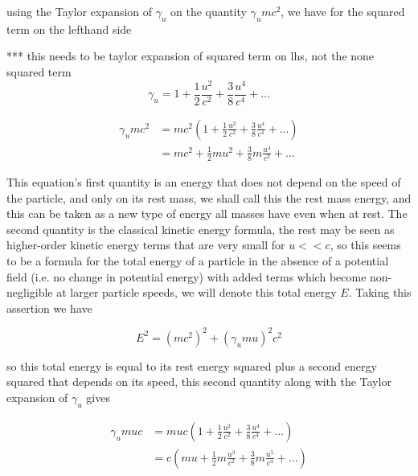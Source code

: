 using the Taylor expansion of $\gamma_{u}$ on the quantity $\gamma_{u} {m}{c}^2$, we have for the squared term on the lefthand side

*** this needs to be taylor expansion of squared term on lhs, not the none squared term
\begin{equation}
	\gamma_{u} = 1 + \frac{1}{2}\frac{u^2}{{c}^2} + \frac{3}{8}\frac{u^4}{c^4} + ...
\end{equation}

\begin{equation}
	\begin{aligned}
		\gamma_{u} {m}{c}^2 & = {m}{c}^2  \left(1 + \frac{1}{2}\frac{u^2}{{c}^2} + \frac{3}{8}\frac{u^4}{c^4} + ...
		\right)                                                                                                     \\
		                    & = {m}{c}^2 + \frac{1}{2}{m}{u}^2 + \frac{3}{8}m\frac{u^4}{{c}^2} + ...
	\end{aligned}
\end{equation}

This equation's first quantity is an energy that does not depend on the speed of the particle, and only on its rest mass, we shall call this the rest mass energy, and this can be taken as a new type of energy all masses have even when at rest.
The second quantity is the classical kinetic energy formula, the rest may be seen as higher-order kinetic energy terms that are very small for ${u}<<{c}$, so this seems to be a formula for the total energy of a particle in the absence of a potential field (i.e.
no change in potential energy) with added terms which become non-negligible at larger particle speeds, we will denote this total energy ${E}$.
Taking this assertion we have

\begin{equation}
	E^2 = \left( {m}{c}^2 \right)^2 + (\gamma_{u}{m}{u})^2{c}^2
\end{equation}

so this total energy is equal to its rest energy squared plus a second energy squared that depends on its speed, this second quantity along with the Taylor expansion of $\gamma_{u}$ gives

\begin{equation}
	\begin{aligned}
		\gamma_{u} {m}{u}{c} & = {m}{u}{c} \left(1 + \frac{1}{2}\frac{u^2}{{c}^2} + \frac{3}{8}\frac{u^4}{c^4} + ...
		\right)                                                                                                       \\
		                     & ={c}\left( {m}{u} + \frac{1}{2}m \frac{u^3}{{c}^2} + \frac{3}{8}m\frac{u^5}{c^4} + ...
		\right)
	\end{aligned}
\end{equation}

